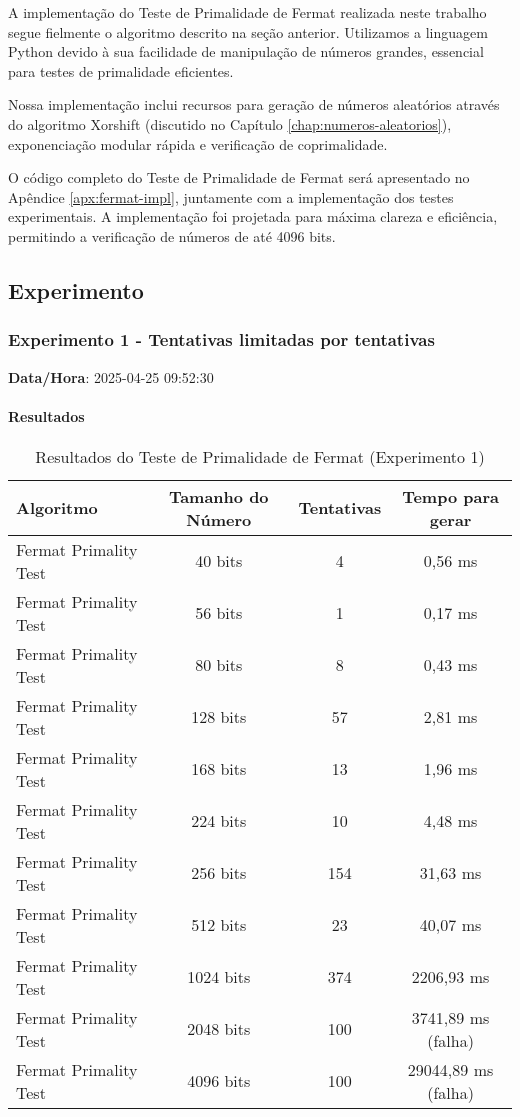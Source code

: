 A implementação do Teste de Primalidade de Fermat realizada neste trabalho segue fielmente o algoritmo descrito na seção anterior. Utilizamos a linguagem Python devido à sua facilidade de manipulação de números grandes, essencial para testes de primalidade eficientes.

Nossa implementação inclui recursos para geração de números aleatórios através do algoritmo Xorshift (discutido no Capítulo \ref{chap:numeros-aleatorios}), exponenciação modular rápida e verificação de coprimalidade.

O código completo do Teste de Primalidade de Fermat será apresentado no Apêndice \ref{apx:fermat-impl}, juntamente com a implementação dos testes experimentais. A implementação foi projetada para máxima clareza e eficiência, permitindo a verificação de números de até 4096 bits.

\subsection{Experimento}

\subsubsection{Experimento 1 - Tentativas limitadas por tentativas}

\textbf{Data/Hora}: 2025-04-25 09:52:30

\paragraph{Resultados}

\begin{table}[H]
\centering
\caption{Resultados do Teste de Primalidade de Fermat (Experimento 1)}
\label{tab:fermat-exp1}
\begin{tabular}{|l|c|c|c|}
\hline
\textbf{Algoritmo} & \textbf{Tamanho do Número} & \textbf{Tentativas} & \textbf{Tempo para gerar} \\
\hline
Fermat Primality Test & 40 bits & 4 & 0,56 ms \\
Fermat Primality Test & 56 bits & 1 & 0,17 ms \\
Fermat Primality Test & 80 bits & 8 & 0,43 ms \\
Fermat Primality Test & 128 bits & 57 & 2,81 ms \\
Fermat Primality Test & 168 bits & 13 & 1,96 ms \\
Fermat Primality Test & 224 bits & 10 & 4,48 ms \\
Fermat Primality Test & 256 bits & 154 & 31,63 ms \\
Fermat Primality Test & 512 bits & 23 & 40,07 ms \\
Fermat Primality Test & 1024 bits & 374 & 2206,93 ms \\
Fermat Primality Test & 2048 bits & 100 & 3741,89 ms (falha) \\
Fermat Primality Test & 4096 bits & 100 & 29044,89 ms (falha) \\
\hline
\end{tabular}
\end{table}

